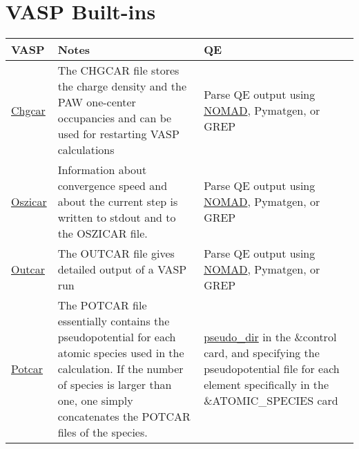\documentclass[12pt]{article}
\begin{document}
\newpage
\section*{VASP Built-ins}
\begin{center}
\begin{table}[ht]
\begin{tabularx}{\linewidth}{|>{\RaggedRight}p{2.5cm}|x|x|}\hline
 VASP  & Notes & QE \\ \hline

 \href{https://www.vasp.at/wiki/index.php/CHGCAR}{Chgcar} &
 The CHGCAR file stores the charge density and the PAW one-center occupancies and can be used for restarting VASP calculations &
Parse QE output using \href{https://github.com/nomad-coe/nomad-parser-quantum-espresso}{NOMAD}, Pymatgen, or GREP  \\ \hline
 
 \href{https://www.vasp.at/wiki/index.php/OSZICAR}{Oszicar} &
 Information about convergence speed and about the current step is written to stdout and to the OSZICAR file. &
Parse QE output using \href{https://github.com/nomad-coe/nomad-parser-quantum-espresso}{NOMAD}, Pymatgen, or GREP   \\ \hline
 
 \href{https://www.vasp.at/wiki/index.php/OUTCAR}{Outcar} &
 The OUTCAR file gives detailed output of a VASP run &
Parse QE output using \href{https://github.com/nomad-coe/nomad-parser-quantum-espresso}{NOMAD}, Pymatgen, or GREP  \\ \hline
 
 \href{https://www.vasp.at/wiki/index.php/POTCAR}{Potcar} &
 The POTCAR file essentially contains the pseudopotential for each atomic species used in the calculation. If the number of species is larger than one, one simply concatenates the POTCAR files of the species. &
\href{https://www.quantum-espresso.org/Doc/INPUT_PW.html#idm1484}{pseudo\_dir} in the \&control card, and specifying the pseudopotential file for each element specifically in the \&ATOMIC\_SPECIES card\\ \hline
\end{tabularx}
\end{table}
\end{center}
\newpage
\end{document}
